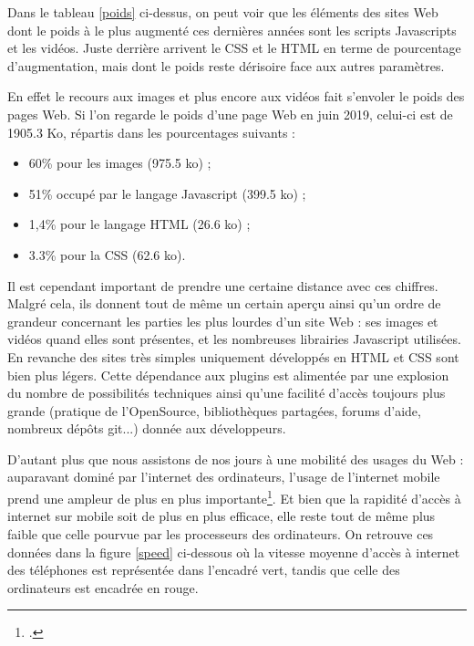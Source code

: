 \documentclass[a4paper,12pt,twoside]{book}
\begin{document}
Dans le tableau \ref{poids} ci-dessus, on peut voir que les éléments des sites Web dont le poids à le plus augmenté ces dernières années sont les scripts Javascripts et les vidéos. Juste derrière arrivent le CSS et le HTML en terme de pourcentage d'augmentation, mais dont le poids reste dérisoire face aux autres paramètres.

En effet le recours aux images et plus encore aux vidéos fait s'envoler le poids des pages Web. Si l'on regarde le poids d'une page Web en juin 2019, celui-ci est de 1905.3 Ko, répartis dans les pourcentages suivants :
\begin{itemize}
    \item 60\% pour les images (975.5 ko) ;
    \item 51\% occupé par le langage Javascript (399.5 ko) ;
    \item 1,4\% pour le langage \acrshort{HTML} (26.6 ko) ;
    \item 3.3\% pour la \acrshort{CSS} (62.6 ko).
\end{itemize}

Il est cependant important de prendre une certaine distance avec ces chiffres. Malgré cela, ils donnent tout de même un certain aperçu ainsi qu'un ordre de grandeur concernant les parties les plus lourdes d'un site Web : ses images et vidéos quand elles sont présentes, et les nombreuses librairies Javascript utilisées. En revanche des sites très simples uniquement développés en \acrshort{HTML} et \acrshort{CSS} sont bien plus légers. Cette dépendance aux plugins est alimentée par une explosion du nombre de possibilités techniques ainsi qu'une facilité d'accès toujours plus grande (pratique de l'OpenSource, bibliothèques partagées, forums d'aide, nombreux dépôts git...) donnée aux développeurs.

D'autant plus que nous assistons de nos jours à une mobilité des usages du Web : auparavant dominé par l'internet des ordinateurs, l'usage de l'internet mobile prend une ampleur de plus en plus importante\footcite{digital}. Et bien que la rapidité d'accès à internet sur mobile soit de plus en plus efficace, elle reste tout de même plus faible que celle pourvue par les processeurs des ordinateurs. On retrouve ces données dans la figure \ref{speed} ci-dessous où la vitesse moyenne d'accès à internet des téléphones est représentée dans l'encadré vert, tandis que celle des ordinateurs est encadrée en rouge.
\end{document}
